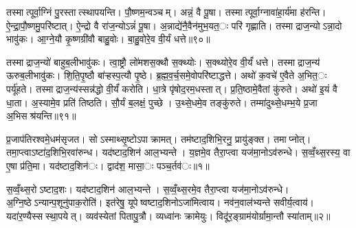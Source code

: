 तस्मात्पूर्वा॒ग्निं पु॒रस्तात्स्थापयन्ति। पौ॒ष्णम॒न्वञ्चम्। अन्नं॒ वै पू॒षा। तस्मात्पूर्वा॒ग्नावा॑हा॒र्य॑मा ह॑रन्ति। ऐ॒न्द्रा॒पौ॒ष्णमु॒परि॑ष्टात्। ऐ॒न्द्रो वै रा॑ज॒न्योऽन्नं॑ पू॒षा। अ॒न्नाद्ये॑नै॒वैन॑मुभ॒यत॒ः परि॑ गृह्णाति। तस्माद्राज॒न्योऽन्ना॒दो भावु॑कः। आ॒ग्ने॒यौ कृ॒ष्णग्री॑वौ बाहु॒वोः। बा॒हु॒वोरे॒व वी॒र्यं धत्ते॥९०॥

तस्माद्राज॒न्यो॑ बाहुब॒लीभावु॑कः। त्वा॒ष्ट्रौ लो॑मशस॒क्थौ स॒क्थ्योः। स॒क्थ्योरे॒व वी॒र्यं॑ धत्ते। तस्माद्राज॒न्य॑ ऊरुब॒लीभावु॑कः। शि॒ति॒पृ॒ष्ठौ बा॑ऱ्हस्प॒त्यौ पृ॒ष्ठे। ब्र॒ह्म॒व॒र्च॒समे॒वोपरि॑ष्टाद्धत्ते। अथो॑ क॒वचे॑ ए॒वैते अ॒भित॒ः पर्यू॑हते। तस्माद्राज॒न्य॑स्सन्न॑द्धो वी॒र्यं॑ करोति। धा॒त्रे पृ॑षोद॒रम॒धस्तात्। प्र॒ति॒ष्ठामे॒वैतां कु॑रुते। अथो॑ इ॒यं वै धा॒ता। अ॒स्यामे॒व प्रति॑ तिष्ठति। सौ॒र्यं ब॒लक्षं॒ पुच्छे। उ॒थ्से॒धमे॒व तङ्कु॑रुते। तम्मा॑दुथ्से॒धम्भ॒ये प्र॒जा अ॒भिसश्र॑यन्ति॥९१॥




प्र॒जाप॑तिरश्वमे॒धम॑सृजत। सोऽस्माथ्सृ॒ष्टोऽपाक्रामत्। तम॑ष्टाद॒शिभि॒रनु॒ प्रायु॑ङ्क्त। तमाप्नोत्। तमा॒प्त्वाऽष्टा॑द॒शिभि॒रवा॑रुन्ध। यद॑ष्टाद॒शिन॑ आल॒भ्यन्ते। य॒ज्ञमे॒व तैरा॒प्त्वा यज॑मा॒नोऽव॑रुन्धे। स॒व्वँ॒थ्स॒रस्य॒ वा ए॒षा प्र॑ति॒मा। यद॑ष्टाद॒शिन॑ः। द्वाद॑श॒ मासा॒ः पञ्च॒र्तव॑ः॥१॥

स॒व्वँ॒थ्स॒रोऽष्टाद॒शः। यद॑ष्टाद॒शिन॑ आल॒भ्यन्ते। स॒व्वँ॒थ्स॒रमे॒व तैरा॒प्त्वा यज॑मा॒नोऽव॑रुन्धे। अ॒ग्नि॒ष्ठेऽन्यान्प॒शूनु॑पाक॒रोति॑। इत॑रेषु॒ यूपेष्वष्टाद॒शिनोऽजा॑मित्वाय। नव॑न॒वाल॑भ्यन्ते सवीर्य॒त्वाय॑। यदा॑र॒ण्यैस्सस्था॒पयेत्। व्यव॑स्येतां पितापु॒त्रौ। व्यध्वा॑नः क्रामेयुः। विदू॑र॒ङ्ग्राम॑योर्ग्रामा॒न्तौ स्या॑ताम्॥२॥

